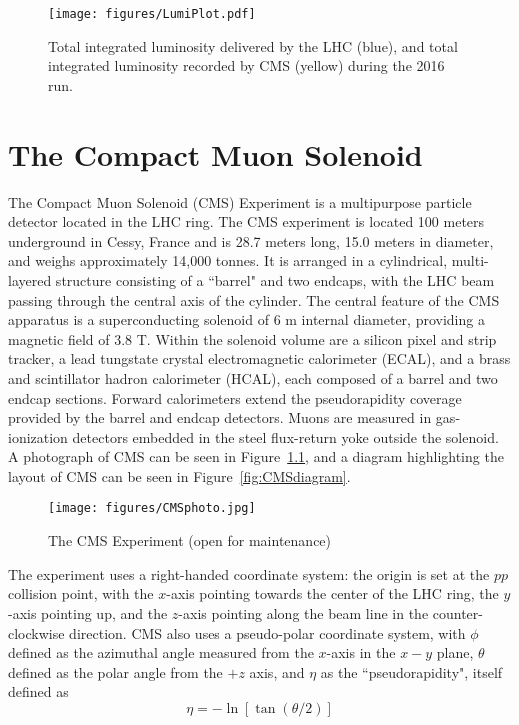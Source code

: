 \begin{figure}\centering
  \texttt{[image: figures/LumiPlot.pdf]}
  \caption{\label{fig:LumiPlot} Total integrated luminosity delivered by the LHC (blue), and total integrated luminosity recorded by CMS (yellow) during the 2016 run.}
\end{figure}


\chapter{The Compact Muon Solenoid}

The Compact Muon Solenoid (CMS) Experiment is a multipurpose particle detector located in the LHC ring. The CMS experiment is located 100 meters underground in Cessy, France and is 28.7 meters long, 15.0 meters in diameter, and weighs approximately 14,000 tonnes. It is arranged in a cylindrical, multi-layered structure consisting of a ``barrel" and two endcaps, with the LHC beam passing through the central axis of the cylinder. The central feature of the CMS apparatus is a superconducting solenoid of 6 m internal diameter, providing a magnetic field of 3.8 T. Within the solenoid volume are a silicon pixel and strip tracker, a lead tungstate crystal electromagnetic calorimeter (ECAL), and a brass and scintillator hadron calorimeter (HCAL), each composed of a barrel and two endcap sections. Forward calorimeters extend the pseudorapidity coverage provided by the barrel and endcap detectors. Muons are measured in gas-ionization detectors embedded in the steel flux-return yoke outside the solenoid. A photograph of CMS can be seen in Figure~\ref{fig:CMSphoto}, and a diagram highlighting the layout of CMS can be seen in Figure~\ref{fig:CMSdiagram}.
\begin{figure}\centering
  \texttt{[image: figures/CMSphoto.jpg]}
  \caption{\label{fig:CMSphoto} The CMS Experiment (open for maintenance)}
\end{figure}
The experiment uses a right-handed coordinate system: the origin is set at the $pp$ collision point, with the $x$-axis pointing towards the center of the LHC ring, the $y$-axis pointing up, and the $z$-axis pointing along the beam line in the counter-clockwise direction. CMS also uses a pseudo-polar coordinate system, with $\phi$ defined as the azimuthal angle measured from the $x$-axis in the $x-y$ plane, $\theta$ defined as the polar angle from the $+z$ axis, and $\eta$ as the ``pseudorapidity", itself defined as 
\begin{equation}
 \eta = -\ln\left[\tan\left(\theta/2\right)\right]
 \end{equation}

